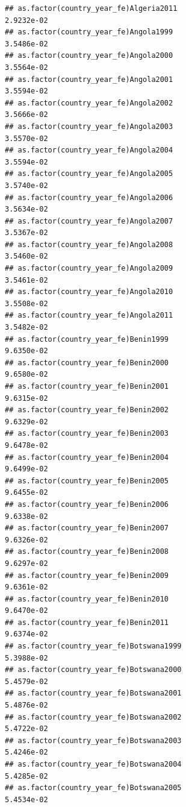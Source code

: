 \documentclass[
  a4paper,
]{article}
\begin{document}
\begin{verbatim}
## as.factor(country_year_fe)Algeria2011                           2.9232e-02
## as.factor(country_year_fe)Angola1999                            3.5486e-02
## as.factor(country_year_fe)Angola2000                            3.5564e-02
## as.factor(country_year_fe)Angola2001                            3.5594e-02
## as.factor(country_year_fe)Angola2002                            3.5666e-02
## as.factor(country_year_fe)Angola2003                            3.5570e-02
## as.factor(country_year_fe)Angola2004                            3.5594e-02
## as.factor(country_year_fe)Angola2005                            3.5740e-02
## as.factor(country_year_fe)Angola2006                            3.5634e-02
## as.factor(country_year_fe)Angola2007                            3.5367e-02
## as.factor(country_year_fe)Angola2008                            3.5460e-02
## as.factor(country_year_fe)Angola2009                            3.5461e-02
## as.factor(country_year_fe)Angola2010                            3.5508e-02
## as.factor(country_year_fe)Angola2011                            3.5482e-02
## as.factor(country_year_fe)Benin1999                             9.6350e-02
## as.factor(country_year_fe)Benin2000                             9.6580e-02
## as.factor(country_year_fe)Benin2001                             9.6315e-02
## as.factor(country_year_fe)Benin2002                             9.6329e-02
## as.factor(country_year_fe)Benin2003                             9.6478e-02
## as.factor(country_year_fe)Benin2004                             9.6499e-02
## as.factor(country_year_fe)Benin2005                             9.6455e-02
## as.factor(country_year_fe)Benin2006                             9.6338e-02
## as.factor(country_year_fe)Benin2007                             9.6326e-02
## as.factor(country_year_fe)Benin2008                             9.6297e-02
## as.factor(country_year_fe)Benin2009                             9.6361e-02
## as.factor(country_year_fe)Benin2010                             9.6470e-02
## as.factor(country_year_fe)Benin2011                             9.6374e-02
## as.factor(country_year_fe)Botswana1999                          5.3988e-02
## as.factor(country_year_fe)Botswana2000                          5.4579e-02
## as.factor(country_year_fe)Botswana2001                          5.4876e-02
## as.factor(country_year_fe)Botswana2002                          5.4722e-02
## as.factor(country_year_fe)Botswana2003                          5.4246e-02
## as.factor(country_year_fe)Botswana2004                          5.4285e-02
## as.factor(country_year_fe)Botswana2005                          5.4534e-02

\end{verbatim}
\end{document}
